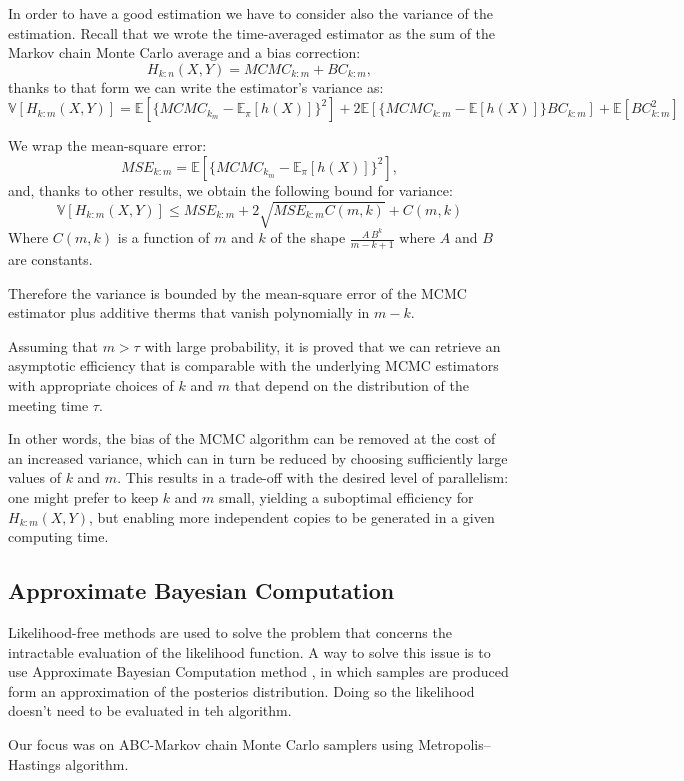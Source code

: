 \documentclass {article}
\begin{document}
In order to have a good estimation we have to consider also the variance of the estimation. Recall that we wrote the time-averaged estimator as the sum of the Markov chain Monte Carlo average and a bias correction: 
$$ 
H_{k:n}(X,Y) 
= MCMC_{k:m} + BC_{k:m},$$
thanks to that form we can write the estimator's variance as:
$$ 
\mathbb{V}[H_{k:m}(X,Y)] 
= \mathbb{E}[\{MCMC_{k_m} - \mathbb{E}_\pi[h(X)]\}^2] 
+ 2 \mathbb{E}[\{MCMC_{k:m} - \mathbb{E}[h(X)]\}BC_{k:m}] 
+ \mathbb{E}[BC_{k:m}^2] 
$$

We wrap the mean-square error:
$$
MSE_{k:m}=  \mathbb{E}[\{MCMC_{k_m} - \mathbb{E}_\pi[h(X)]\}^2],
$$
and, thanks to other results, we obtain the following bound for variance:
$$
\mathbb{V}[H_{k:m}(X,Y)]
\leq MSE_{k:m} + 2 \sqrt{MSE_{k:m} C(m,k)} + C(m,k)
$$
Where $C(m,k)$ is a function of $m$ and $k$ of the shape $\frac{A \, B^k}{m-k+1}$ where $A$ and $B$ are constants.

Therefore the variance is bounded by the mean-square error of the MCMC estimator plus additive therms that vanish polynomially in $m-k$.

Assuming that $m > \tau$ with large probability, it is proved that we can retrieve an asymptotic efficiency that is comparable with the underlying MCMC estimators with appropriate choices of $k$ and $m$ that depend on the distribution of the meeting time $\tau$.

In other words, the bias of the MCMC algorithm can be removed at the cost of an increased variance, which can in turn be reduced by choosing sufficiently large values of $k$ and $m$. This results in a trade-off with the desired level of parallelism: one might prefer to keep $k$ and $m$ small, yielding a suboptimal efficiency for $H_{k:m}(X,Y)$, but enabling more independent copies to be generated in a given computing time.


\subsection{Approximate Bayesian Computation}

Likelihood-free methods are used to solve the problem that concerns the intractable evaluation of the likelihood function. A way to solve this issue is to use Approximate Bayesian Computation method \cite{sisson2018overview}, in which samples are produced form an approximation of the posterios distribution.
Doing so the likelihood doesn't need to be evaluated in teh algorithm.

Our focus was on ABC-Markov chain Monte Carlo samplers using Metropolis–Hastings algorithm.
\end{document}
